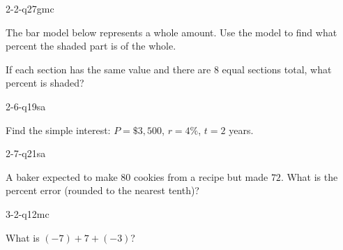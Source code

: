 \begin{practiceQuestion}{2-2-q27}{gmc}
\begin{questionText}
The bar model below represents a whole amount. Use the model to find what percent the shaded part is of the whole.

\begin{center}
\end{center}

If each section has the same value and there are $8$ equal sections total, what percent is shaded?
\end{questionText}
\end{practiceQuestion}

\begin{practiceQuestion}{2-6-q19}{sa}
\begin{questionText}
Find the simple interest: $P = \$3{,}500$, $r = 4\%$, $t = 2$ years.
\end{questionText}
\end{practiceQuestion}

\begin{practiceQuestion}{2-7-q21}{sa}
\begin{questionText}
A baker expected to make $80$ cookies from a recipe but made $72$. What is the percent error (rounded to the nearest tenth)?
\end{questionText}
\end{practiceQuestion}

\begin{practiceQuestion}{3-2-q12}{mc}
\begin{questionText}
What is $(-7) + 7 + (-3)$?
\end{questionText}
\end{practiceQuestion}

